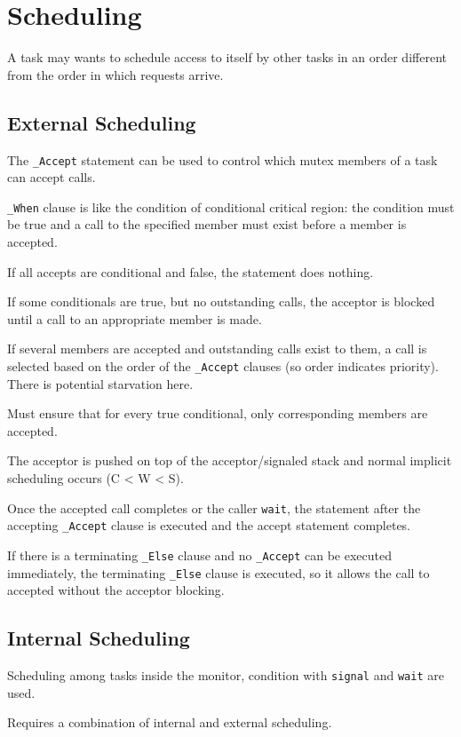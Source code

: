 \documentclass[11pt]{article}
\begin{document}
\section{Scheduling}
\label{sec:org3144388}
A task may wants to schedule access to itself by other tasks in an order different from the order in which
requests arrive.
\subsection{External Scheduling}
\label{sec:org6068290}
The \texttt{\_Accept} statement can be used to control which mutex members of a task can accept calls.

\texttt{\_When} clause is like the condition of conditional critical region:
the condition must be true and a call to the specified member must exist before a member is accepted.

If all accepts are conditional and false, the statement does nothing.

If some conditionals are true, but no outstanding calls, the acceptor is blocked until a call to an
appropriate member is made.

If several members are accepted and outstanding calls exist to them, a call is selected based on the order
of the \texttt{\_Accept} clauses (so order indicates priority).
There is potential starvation here.

Must ensure that for every true conditional, only corresponding members are accepted.

The acceptor is pushed on top of the acceptor/signaled stack and normal implicit scheduling
occurs (C < W < S).

Once the accepted call completes or the caller \texttt{wait}, the statement after the accepting \texttt{\_Accept}
clause is executed and the accept statement completes.

If there is a terminating \texttt{\_Else} clause and no \texttt{\_Accept} can be executed immediately, the terminating
\texttt{\_Else} clause is executed, so it allows the call to accepted without the acceptor blocking.
\subsection{Internal Scheduling}
\label{sec:org3838983}
Scheduling among tasks inside the monitor, condition with \texttt{signal} and \texttt{wait} are used.

Requires a combination of internal and external scheduling.
\end{document}
